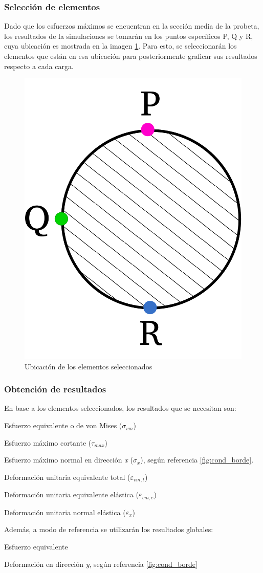 \subsubsection{Selección de elementos}
Dado que los esfuerzos máximos se encuentran en la sección media de la probeta, los resultados de la simulaciones se tomarán en los puntos específicos P, Q y R, cuya ubicación es mostrada en la imagen \ref{fig:diag_pqr}. Para esto, se seleccionarán los elementos que están en esa ubicación para posteriormente graficar sus resultados respecto a cada carga.

\begin{figure}[h]
\centering
\includegraphics[width=0.3\linewidth]{Imagenes/diagelem_pqr.pdf}
\caption{Ubicación de los elementos seleccionados}
\label{fig:diag_pqr}
\end{figure}

\subsubsection{Obtención de resultados}
En base a los elementos seleccionados, los resultados que se necesitan son:
\begin{itemize*}
	\item Esfuerzo equivalente o de von Mises ($\sigma_{vm}$)
	\item Esfuerzo máximo cortante ($\tau_{max}$)
	\item Esfuerzo máximo normal en dirección \textit{x} ($\sigma_{x}$), según referencia \ref{fig:cond_borde}.
	\item Deformación unitaria equivalente total ($\varepsilon_{vm,t}$)
	\item Deformación unitaria equivalente elástica ($\varepsilon_{vm,e}$)
	\item Deformación unitaria normal elástica ($\varepsilon_{x}$)
\end{itemize*}

Además, a modo de referencia se utilizarán los resultados globales:
\begin{itemize*}
	\item Esfuerzo equivalente
	\item Deformación en dirección \textit{y}, según referencia \ref{fig:cond_borde}
\end{itemize*}
